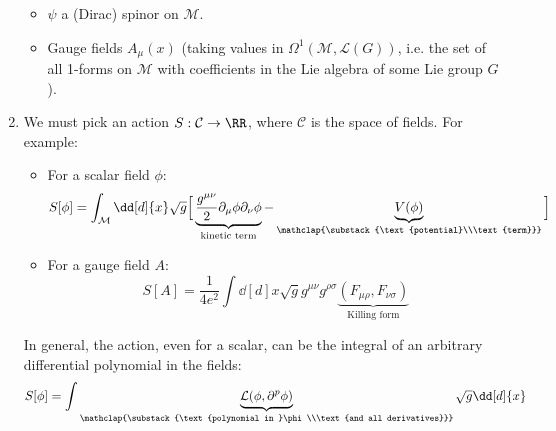 \documentclass{jknotes}
\begin{document}
\begin{enumerate}
\begin{itemize}
\begin{figure}[H]
                \end{figure}
            \item \(\psi\) a (Dirac) spinor on \(\mathcal{M}\).
            \item Gauge fields \(A_\mu(x)\) (taking values in \(\Omega^1(\mathcal{M},\mathcal{L}(G))\), i.e. the set of all 1-forms on \(\mathcal{M}\) with coefficients in the Lie algebra of some Lie group \(G\)).
        \end{itemize}
    \item We must pick an action \(S:\mathcal{C}\rightarrow\RR\), where \(\mathcal{C}\) is the space of fields. For example:
        \begin{itemize}
            \item For a scalar field \(\phi\):
                \begin{equation}
                    S[\phi] = \int_\mathcal{M}\dd[d]{x}\sqrt{g}\Big[ \underbrace{\frac{g^{\mu\nu}}{2}\partial_\mu\phi\partial_\nu\phi}_{\text{kinetic term}}-\underbrace{V(\phi)}_{\mathclap{\substack{\text{potential}\\\text{term}}}} \Big]
                \end{equation}
            \item For a gauge field \(A\):
                \begin{equation}
                    S[A] = \frac{1}{4e^2}\int\dd[d]{x}\sqrt{g}g^{\mu\nu}g^{\rho\sigma}\underbrace{(F_{\mu\rho},F_{\nu\sigma})}_{\text{Killing form}}
                \end{equation}
        \end{itemize}
        In general, the action, even for a scalar, can be the integral of an arbitrary differential polynomial in the fields:
        \begin{equation}
            S[\phi] = \int \underbrace{\mathcal{L}(\phi,\partial^p\phi)}_{\mathclap{\substack{\text{polynomial in }\phi\\\text{and all derivatives}}}} \sqrt{g} \dd[d]{x}
        \end{equation}
\end{enumerate}
\end{document}

